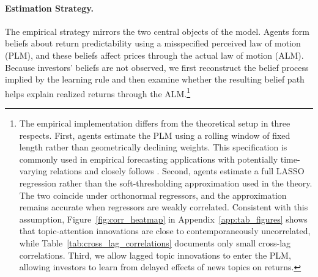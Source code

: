 \paragraph{Estimation Strategy.}

The empirical strategy mirrors the two central objects of the model. Agents form beliefs about return predictability using a misspecified perceived law of motion (PLM), and these beliefs affect prices through the actual law of motion (ALM). Because investors' beliefs are not observed, we first reconstruct the belief process implied by the learning rule and then examine whether the resulting belief path helps explain realized returns through the ALM.\footnote{The empirical implementation differs from the theoretical setup in three respects. First, agents estimate the PLM using a rolling window of fixed length rather than geometrically declining weights. This specification is commonly used in empirical forecasting applications with potentially time-varying relations and closely follows \citet{Chinco2019}. Second, agents estimate a full LASSO regression rather than the soft-thresholding approximation used in the theory. The two coincide under orthonormal regressors, and the approximation remains accurate when regressors are weakly correlated. Consistent with this assumption, Figure~\ref{fig:corr_heatmap} in Appendix~\ref{app:tab_figures} shows that topic-attention innovations are close to contemporaneously uncorrelated, while Table~\ref{tab:cross_lag_correlations} documents only small cross-lag correlations. Third, we allow lagged topic innovations to enter the PLM, allowing investors to learn from delayed effects of news topics on returns.}

